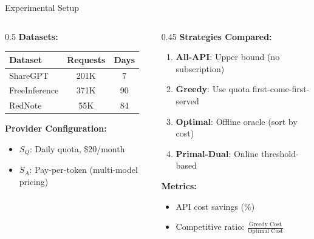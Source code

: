 \documentclass[aspectratio=169,10pt]{beamer}
\begin{document}
\begin{frame}{Experimental Setup}
\begin{columns}[T]
\begin{column}{0.5\textwidth}
\textbf{Datasets:}
\begin{table}[h]
\footnotesize
\begin{tabular}{lcc}
\toprule
Dataset & Requests & Days \\
\midrule
ShareGPT & 201K & 7 \\
FreeInference & 371K & 90 \\
RedNote & 55K & 84 \\
\bottomrule
\end{tabular}
\end{table}

\vspace{0.2cm}
\textbf{Provider Configuration:}
\begin{itemize}
    \item $S_Q$: Daily quota, \$20/month
    \item $S_A$: Pay-per-token (multi-model pricing)
\end{itemize}
\end{column}

\begin{column}{0.45\textwidth}
\textbf{Strategies Compared:}
\begin{enumerate}
    \item \textbf{All-API}: Upper bound (no subscription)
    \item \textbf{Greedy}: Use quota first-come-first-served
    \item \textbf{Optimal}: Offline oracle (sort by cost)
    \item \textbf{Primal-Dual}: Online threshold-based
\end{enumerate}

\vspace{0.3cm}
\textbf{Metrics:}
\begin{itemize}
    \item API cost savings (\%)
    \item Competitive ratio: $\frac{\text{Greedy Cost}}{\text{Optimal Cost}}$
\end{itemize}
\end{column}
\end{columns}
\end{frame}
\end{document}
